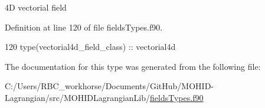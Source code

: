 4D vectorial field 



Definition at line 120 of file fields\+Types.\+f90.


\begin{DoxyCode}
120         \textcolor{keywordtype}{type}(vectorial4d\_field\_class) :: vectorial4d
\end{DoxyCode}


The documentation for this type was generated from the following file\+:\begin{DoxyCompactItemize}
\item 
C\+:/\+Users/\+R\+B\+C\+\_\+workhorse/\+Documents/\+Git\+Hub/\+M\+O\+H\+I\+D-\/\+Lagrangian/src/\+M\+O\+H\+I\+D\+Lagrangian\+Lib/\mbox{\hyperlink{fields_types_8f90}{fields\+Types.\+f90}}\end{DoxyCompactItemize}
